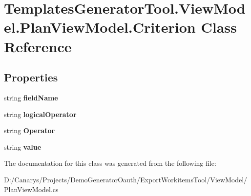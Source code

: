 \hypertarget{class_templates_generator_tool_1_1_view_model_1_1_plan_view_model_1_1_criterion}{}\section{Templates\+Generator\+Tool.\+View\+Model.\+Plan\+View\+Model.\+Criterion Class Reference}
\label{class_templates_generator_tool_1_1_view_model_1_1_plan_view_model_1_1_criterion}
\subsection*{Properties}
\begin{DoxyCompactItemize}
\item 
\mbox{\label{class_templates_generator_tool_1_1_view_model_1_1_plan_view_model_1_1_criterion_a92fa7f4e5cde13a36b1f8e803ebc05d8}} 
string {\bfseries field\+Name}
\item 
\mbox{\label{class_templates_generator_tool_1_1_view_model_1_1_plan_view_model_1_1_criterion_a05f8d036016e12f2823b643cd320a2a1}} 
string {\bfseries logical\+Operator}
\item 
\mbox{\label{class_templates_generator_tool_1_1_view_model_1_1_plan_view_model_1_1_criterion_aadb42843944bfa8d363d28b1da34f5c8}} 
string {\bfseries Operator}
\item 
\mbox{\label{class_templates_generator_tool_1_1_view_model_1_1_plan_view_model_1_1_criterion_adfd471f2a6a77ec8512acfab87bd3f5e}} 
string {\bfseries value}
\end{DoxyCompactItemize}


The documentation for this class was generated from the following file\+:\begin{DoxyCompactItemize}
\item 
D\+:/\+Canarys/\+Projects/\+Demo\+Generator\+Oauth/\+Export\+Workitems\+Tool/\+View\+Model/Plan\+View\+Model.\+cs\end{DoxyCompactItemize}

